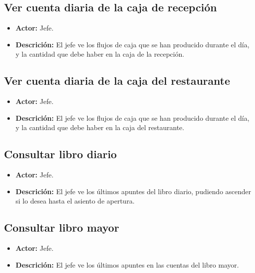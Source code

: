 \documentclass[spanish,a4paper,12pt]{report}	%
\begin{document}
	\subsection{Ver cuenta diaria de la caja de recepción}
		\begin{itemize}
			\item \textbf{Actor:} Jefe.
			\item \textbf{Descrición:} El jefe ve los flujos de caja que se han producido durante el día, y la cantidad que debe haber en la caja de la recepción.	
		\end {itemize}


	\subsection{Ver cuenta diaria de la caja del restaurante}
		\begin{itemize}
			\item \textbf{Actor:} Jefe.
			\item \textbf{Descrición:} El jefe ve los flujos de caja que se han producido durante el día, y la cantidad que debe haber en la caja del restaurante.	
		\end {itemize}


	\subsection{Consultar libro diario}
		\begin{itemize}
			\item \textbf{Actor:} Jefe.
			\item \textbf{Descrición:} El jefe ve los últimos apuntes del libro diario, pudiendo ascender si lo desea hasta el asiento de apertura.	
		\end {itemize}


	\subsection{Consultar libro mayor}
		\begin{itemize}
			\item \textbf{Actor:} Jefe.
			\item \textbf{Descrición:} El jefe ve los últimos apuntes en las cuentas del libro mayor. \\
		\end {itemize}
\end{document}
